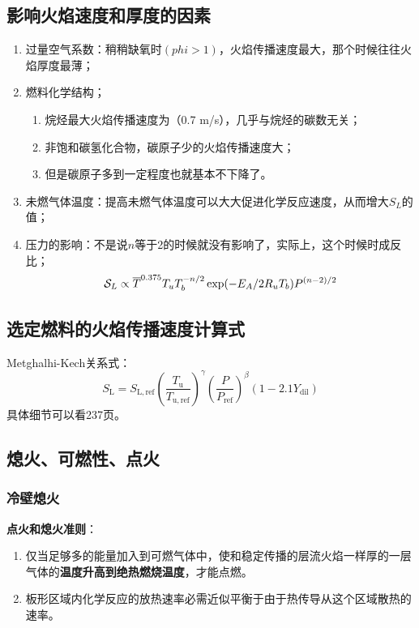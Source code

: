 \subsection{影响火焰速度和厚度的因素}
\begin{enumerate}
    \item 过量空气系数：稍稍缺氧时\((phi>1)\)，火焰传播速度最大，那个时候往往火焰厚度最薄；
    \item 燃料化学结构；
    \begin{enumerate}
        \item 烷烃最大火焰传播速度为（0.7 m/s），几乎与烷烃的碳数无关；
        \item 非饱和碳氢化合物，碳原子少的火焰传播速度大；
        \item 但是碳原子多到一定程度也就基本不下降了。
    \end{enumerate}
    \item 未燃气体温度：提高未燃气体温度可以大大促进化学反应速度，从而增大\(S_L\)的值；
    \item 压力的影响：不是说\(n\)等于2的时候就没有影响了，实际上，这个时候时成反比；
    \[{\cal S}_{L}\propto\overline{{{T}}}^{0.375}T_{u}T_{b}^{-n/2}\exp(-E_{A}/2R_{u}T_{b})P^{(n-2)/2}\]
\end{enumerate}

\subsection{选定燃料的火焰传播速度计算式}
Metghalhi-Kech关系式：
\begin{equation}
    S_\mathrm{L} = S_\mathrm{L,ref}\left(\frac{T_\mathrm{u}}{T_\mathrm{u,ref}}\right)^\gamma\left(\frac{P}{P_\mathrm{ref}}\right)^\beta (1-2.1 Y_\mathrm{dil})
\end{equation}
具体细节可以看237页。

\subsection{熄火、可燃性、点火}

\subsubsection{冷壁熄火}
\textbf{点火和熄火准则}：
\begin{enumerate}
    \item 仅当足够多的能量加入到可燃气体中，使和稳定传播的层流火焰一样厚的一层气体的\textbf{温度升高到绝热燃烧温度}，才能点燃。
    \item 板形区域内化学反应的放热速率必需近似平衡于由于热传导从这个区域散热的速率。
\end{enumerate}

